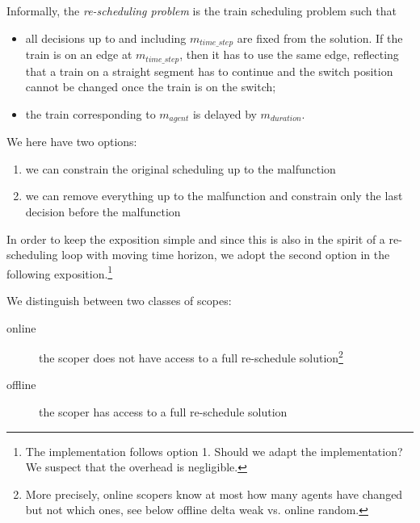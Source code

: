\documentclass{article}
\begin{document}
Informally, the \emph{re-scheduling problem} is the train scheduling problem such that
\begin{itemize}
    \item all decisions up to and including $m_{time\_step}$ are fixed from the solution. If the train is on an edge at $m_{time\_step}$, then it has to use the same edge, reflecting that a train on a straight segment has to continue and the switch position cannot be changed once the train is on the switch;
    \item the train corresponding to $m_{agent}$ is delayed by $m_{duration}$.
\end{itemize}
We here have two options:
\begin{enumerate}
    \item we can constrain the original scheduling up to the malfunction
    \item we can remove everything up to the malfunction and constrain only the last decision before the malfunction
\end{enumerate}
In order to keep the exposition simple and since this is also in the spirit of a re-scheduling loop with moving time horizon, we adopt the second option in the following exposition.\footnote{The implementation follows option 1. Should we adapt the implementation? We suspect that the overhead is negligible.}

We distinguish between two classes of scopes:
\begin{description}
\item[online] the scoper does not have access to a full re-schedule solution\footnote{More precisely, online scopers know at most how many agents have changed but not which ones, see below offline delta weak vs. online random.}
\item[offline] the scoper has access to a full re-schedule solution
\end{description}
\end{document}
